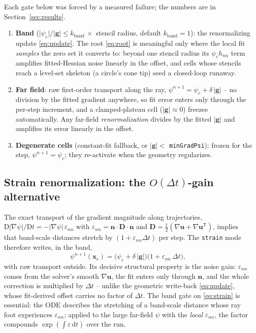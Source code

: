 \documentclass[preprint,3p,11pt]{elsarticle}
\newcommand{\psilev}{\psi}
\newcommand{\xc}{\mathbf{x}_c}
\newcommand{\uvec}{\mathbf{u}}
\newcommand{\nv}{\mathbf{n}}
\newcommand{\gv}{\mathbf{g}}
\newcommand{\gradpsi}{\lvert\nabla\psilev\rvert}
\begin{document}
Each gate below was forced by a measured failure; the numbers are in
Section~\ref{sec:results}.
\begin{enumerate}
\item \textbf{Band} ($\lvert\psilev_c\rvert/\lvert\gv\rvert\le
  k_{\mathrm{band}}\,\times$ stencil radius, default $k_{\mathrm{band}}=1$):
  the renormalizing update \eqref{eq:update}. The root \eqref{eq:root} is
  meaningful only where the local fit \emph{samples} the zero set it converts
  to: beyond one stencil radius its $\psilev_c h_{nn}$ term amplifies
  fitted-Hessian noise linearly in the offset, and cells whose stencils reach
  a level-set skeleton (a circle's cone tip) seed a closed-loop runaway.
\item \textbf{Far field}: raw first-order transport along the ray,
  $\psilev^{n+1}=\psilev_c+\delta\,\lvert\gv\rvert$ -- no division by the
  fitted gradient anywhere, so fit error enters only through the per-step
  increment, and a clamped-plateau cell ($\lvert\gv\rvert\approx0$) freezes
  automatically. Any far-field \emph{renormalization} divides by the fitted
  $\lvert\gv\rvert$ and amplifies its error linearly in the offset.
\item \textbf{Degenerate cells} (constant-fit fallback, or
  $\lvert\gv\rvert<$ \texttt{minGradPsi}): frozen for the step,
  $\psilev^{n+1}=\psilev_c$; they re-activate when the geometry regularizes.
\end{enumerate}

\subsection{Strain renormalization: the $O(\Delta t)$-gain alternative}
\label{sec:strain}

The exact transport of the gradient magnitude along trajectories,
$\mathrm D\gradpsi/\mathrm Dt=-\gradpsi\,\varepsilon_{nn}$ with
$\varepsilon_{nn}=\nv\cdot\mathbf D\cdot\nv$ and
$\mathbf D=\tfrac12(\nabla\uvec+\nabla\uvec^{\mathsf T})$, implies that
band-scale distances stretch by $(1+\varepsilon_{nn}\Delta t)$ per step. The
\texttt{strain} mode therefore writes, in the band,
\begin{equation}
  \psilev^{n+1}(\xc)
  =\bigl(\psilev_c+\delta\,\lvert\gv\rvert\bigr)
   \bigl(1+\varepsilon_{nn}\,\Delta t\bigr),
  \label{eq:strain}
\end{equation}
with raw transport outside. Its decisive structural property is the noise
gain: $\varepsilon_{nn}$ comes from the solver's smooth $\nabla\uvec$, the fit
enters only through $\nv$, and the whole correction is multiplied by
$\Delta t$ -- unlike the geometric write-back \eqref{eq:update}, whose
fit-derived offset carries no factor of $\Delta t$. The band gate on
\eqref{eq:strain} is essential: the ODE describes the stretching of a
band-scale distance whose ray foot experiences $\varepsilon_{nn}$; applied to
the large far-field $\psilev$ with the \emph{local} $\varepsilon_{nn}$, the
factor compounds $\exp(\int\varepsilon\,\mathrm dt)$ over the run.
\end{document}
